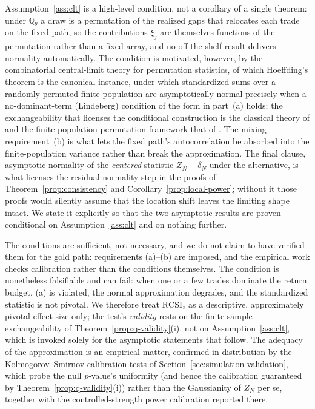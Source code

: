 \documentclass[preprint,12pt]{elsarticle}
\theoremstyle{definition}
\begin{document}
Assumption~\ref{ass:clt} is a high-level condition, not a corollary of a single
theorem: under $\mathbb{Q}_\theta$ a draw is a permutation of the realized gaps
that relocates each trade on the fixed path, so the contributions $\xi_j$ are
themselves functions of the permutation rather than a fixed array, and no
off-the-shelf result delivers normality automatically. The condition is
motivated, however, by the combinatorial central-limit theory for permutation
statistics, of which Hoeffding's theorem \cite{Hoeffding1951} is the canonical
instance, under which standardized sums over a randomly permuted finite
population are asymptotically normal precisely when a no-dominant-term (Lindeberg)
condition of the form in part~(a) holds; the exchangeability that licenses the
conditional construction is the classical theory of \cite{Aldous1985} and the
finite-population permutation framework that of \cite{LehmannRomano2005}. The
mixing requirement~(b) is what lets the fixed path's autocorrelation be absorbed
into the finite-population variance rather than break the approximation. The final
clause, asymptotic normality of the \emph{centered} statistic $Z_N-\delta_N$ under
the alternative, is what licenses the residual-normality step in the proofs of
Theorem~\ref{prop:consistency} and Corollary~\ref{prop:local-power}; without it
those proofs would silently assume that the location shift leaves the limiting
shape intact. We state it explicitly so that the two asymptotic results are
proven conditional on Assumption~\ref{ass:clt} and on nothing further.

The conditions are sufficient, not necessary, and we do not claim to have verified
them for the gold path: requirements (a)--(b) are imposed, and the empirical work
checks calibration rather than the conditions themselves. The condition is
nonetheless falsifiable and can fail: when one or a few trades dominate the return
budget, (a) is violated, the normal approximation degrades, and the standardized
statistic is not pivotal. We therefore treat $\mathrm{RCSI}_z$ as a descriptive,
approximately pivotal effect size only; the test's \emph{validity} rests on the
finite-sample exchangeability of Theorem~\ref{prop:q-validity}(i), not on
Assumption~\ref{ass:clt}, which is invoked solely for the asymptotic statements
that follow. The adequacy of the approximation is an empirical matter, confirmed
in distribution by the Kolmogorov--Smirnov calibration tests of
Section~\ref{sec:simulation-validation}, which probe the null $p$-value's
uniformity (and hence the calibration guaranteed by
Theorem~\ref{prop:q-validity}(i)) rather than the Gaussianity of $Z_N$ per se,
together with the controlled-strength power calibration reported there.
\end{document}
